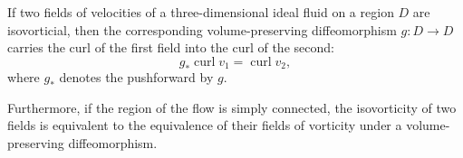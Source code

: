 If two fields of velocities of a three-dimensional ideal fluid on a region $D$ are isovorticial, then the corresponding volume-preserving diffeomorphism $g: D \to D$ carries the curl of the first field into the curl of the second:
$$g_* \operatorname{curl} v_1 = \operatorname{curl} v_2,$$
where $g_*$ denotes the pushforward by $g$.

Furthermore, if the region of the flow is simply connected, the isovorticity of two fields is equivalent to the equivalence of their fields of vorticity under a volume-preserving diffeomorphism.
